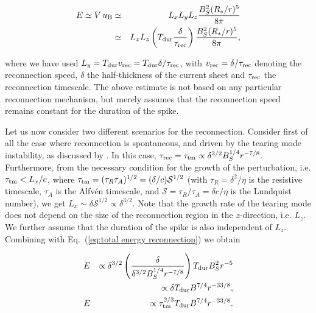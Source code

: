\documentclass[12pt]{emulateapj}
\begin{document}
\begin{eqnarray}\label{eq:total energy reconnection}
E\simeq V\,u_{\rm B} & \simeq &  L_xL_yL_z\frac{B_S^2(R_*/r)^5}{8\pi} \\ \nonumber
				 & \simeq & L_xL_z\left(T_{\rm dur}\frac{\delta}{\tau_{\rm rec}}\right)\frac{B_S^2(R_*/r)^5}{8\pi},
\end{eqnarray}

where we have used $L_y=T_{\rm dur}v_{\rm rec}=T_{\rm dur}\delta/\tau_{\rm rec}$, with $v_{\rm rec}=\delta/\tau_{\rm rec}$ denoting the reconnection speed, $\delta$ the half-thickness of the current sheet and $\tau_{\rm rec}$ the reconnection timescale. The above estimate is not based on any particular reconnection mechanism, but merely assumes that the reconnection speed remains constant for the duration of the spike. 

Let us now consider two different scenarios for the reconnection. Consider first of all the case where reconnection is spontaneous, and driven by the tearing mode instability, as discussed by \citet{lyutikov2003}. In this case, $\tau_{\rm rec}=\tau_{\rm tm}\propto\delta^{3/2}B_S^{1/4}r^{-7/8}$. Furthermore, from the necessary condition for the growth of the perturbation, i.e. $\tau_{\rm tm}<L_x/c$, where $\tau_{\rm tm}=(\tau_R\tau_A)^{1/2}=(\delta/c)\mathcal{S}^{1/2}$ (with $\tau_R=\delta^2/\eta$ is the resistive timescale, $\tau_A$ is the Alfv\'en timescale, and 
$\mathcal{S}=\tau_R/\tau_A=\delta c/\eta$ is the Lundquist number), we get $L_x\sim\delta\mathcal{S}^{1/2}\propto\delta^{3/2}$. Note that the growth rate of the tearing mode does not depend on the size of the reconnection region in the $z$-direction, i.e. $L_z$. We further assume that the duration of the spike is also independent of $L_z$. Combining with Eq.~(\ref{eq:total energy reconnection}) we obtain

\begin{eqnarray}\label{eq}
&E& \propto\delta^{3/2}\left(\frac{\delta}{\delta^{3/2}B_S^{1/4}r^{-7/8}}\right)T_{\rm dur}B_S^2r^{-5} \\
& & \propto\delta T_{\rm dur}B^{7/4}r^{-33/8},\\
&E &\propto\tau_{\rm tm}^{2/3}T_{\rm dur}B^{7/4}r^{-33/8}. \nonumber
\end{eqnarray}
\end{document}
